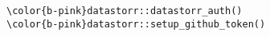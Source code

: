 \documentclass[class=minimal,border=0]{standalone}
\begin{document}
%
\begin{BVerbatim}[bgcolor=b-darkgrey]
\color{b-pink}datastorr::datastorr_auth()
\color{b-pink}datastorr::setup_github_token()
\end{BVerbatim}
\end{document}
